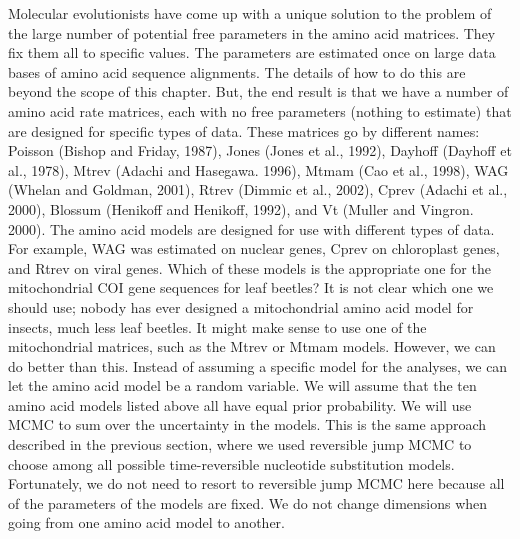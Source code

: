 \documentclass{svmult}
\begin{document}
\begin{description}
Molecular evolutionists have come up with a unique solution to the problem of the large number of potential free parameters in the amino acid matrices. They fix
them all to specific values. The parameters are estimated once on large data bases of amino acid sequence alignments. The details of how to do this
are beyond the scope of this chapter. But, the end result is that we have a number of amino acid rate matrices, each with no free parameters (nothing to estimate)
that are designed for specific types of data. These matrices go by different names: 
Poisson (Bishop and Friday, 1987),
Jones (Jones et al., 1992),                                                  
Dayhoff  (Dayhoff et al., 1978),
Mtrev (Adachi and Hasegawa. 1996),         
Mtmam (Cao et al., 1998),                                        
WAG (Whelan and Goldman, 2001),                                                                              
Rtrev (Dimmic et al., 2002),                                
Cprev (Adachi et al., 2000),                                          
Blossum (Henikoff and Henikoff, 1992), and
Vt (Muller and Vingron. 2000).
The amino acid models are designed for use with different types of data. For example, WAG was estimated on nuclear genes, Cprev on chloroplast genes, and
Rtrev on viral genes. Which of these models is the appropriate one for the mitochondrial COI gene sequences for leaf beetles? It is not clear which one we should use;
nobody has ever designed a mitochondrial amino acid model for insects, much less leaf beetles. It might make sense to use one of the mitochondrial
matrices, such as the Mtrev or Mtmam models. However, we can do better than this. Instead of assuming a specific model for the analyses, we can let the
amino acid model be a random variable. We will assume that the ten amino acid models listed above all have equal prior probability. We will use MCMC to sum over
the uncertainty in the models. This is the same approach described in the previous section, where we used reversible jump MCMC to choose among all possible
time-reversible nucleotide substitution models. Fortunately, we do not need to resort to reversible jump MCMC here because all of the parameters of the models are fixed. We
do not change dimensions when going from one amino acid model to another. 
\end{description}
\end{document}
